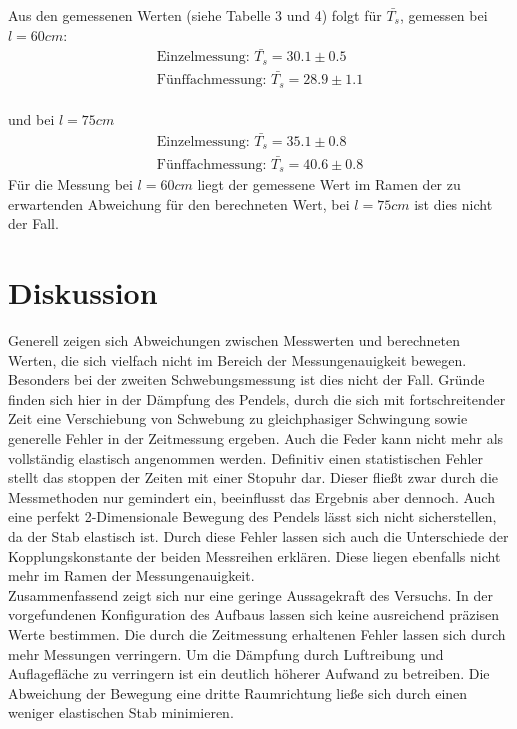 Aus den gemessenen Werten (siehe Tabelle 3 und 4) folgt für $\bar{T_s}$, gemessen bei $l = 60cm$:
\begin{equation*}
\begin{split}
 \text{Einzelmessung: }\bar{T_{s}} = 30.1 \pm 0.5 \\
 \text{Fünffachmessung: }\bar{T_{s}} = 28.9 \pm 1.1
\end{split}
\end{equation*}
\\ und bei $l = 75cm$
\begin{equation*}
\begin{split}
 \text{Einzelmessung: }\bar{T_{s}} = 35.1 \pm 0.8 \\
 \text{Fünffachmessung: }\bar{T_{s}} = 40.6 \pm 0.8
\end{split}
\end{equation*}
Für die Messung bei $l = 60cm$ liegt der gemessene Wert im Ramen der zu erwartenden Abweichung für den berechneten Wert,
bei $l = 75cm$ ist dies nicht der Fall.
\section{Diskussion}
Generell zeigen sich Abweichungen zwischen Messwerten und berechneten Werten, die sich vielfach nicht im Bereich der Messungenauigkeit bewegen.
Besonders bei der zweiten Schwebungsmessung ist dies nicht der Fall. Gründe finden sich hier in der Dämpfung des Pendels, durch die sich mit fortschreitender Zeit eine
Verschiebung von Schwebung zu gleichphasiger Schwingung sowie generelle Fehler in der Zeitmessung ergeben. Auch die Feder kann nicht mehr als vollständig elastisch
angenommen werden. Definitiv einen statistischen Fehler stellt das stoppen der Zeiten mit einer Stopuhr dar. Dieser fließt zwar durch die Messmethoden nur gemindert ein,
beeinflusst das Ergebnis aber dennoch. Auch eine perfekt 2-Dimensionale Bewegung des Pendels lässt sich nicht sicherstellen, da der Stab elastisch ist.
Durch diese Fehler lassen sich auch die Unterschiede der Kopplungskonstante der beiden Messreihen erklären. Diese liegen ebenfalls nicht mehr im Ramen der Messungenauigkeit.
\\
Zusammenfassend zeigt sich nur eine geringe Aussagekraft des Versuchs. In der vorgefundenen Konfiguration des Aufbaus lassen sich keine ausreichend präzisen Werte bestimmen.
Die durch die Zeitmessung erhaltenen Fehler lassen sich durch mehr Messungen verringern. Um die Dämpfung durch Luftreibung und Auflagefläche zu verringern ist ein deutlich höherer
Aufwand zu betreiben. Die Abweichung der Bewegung eine dritte Raumrichtung ließe sich durch einen weniger elastischen Stab minimieren.

\newpage
\nocite{*}
\printbibliography
